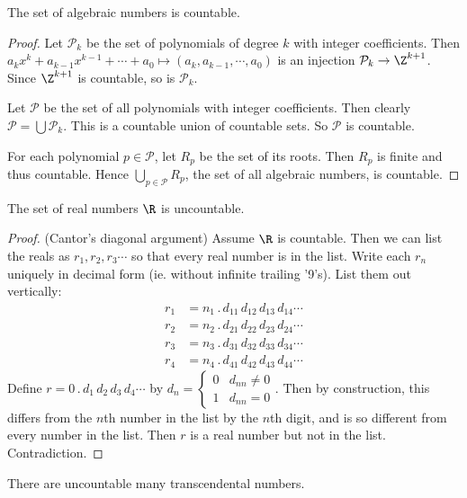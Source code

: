 \documentclass[a4paper]{article}
\begin{document}
\begin{thm}
  The set of algebraic numbers is countable.
\end{thm}
\begin{proof}
  Let $\mathcal{P}_k$ be the set of polynomials of degree $k$ with integer coefficients. Then  $a_kx^k + a_{k - 1}x^{k - 1} + \cdots + a_0 \mapsto (a_k, a_{k - 1}, \cdots, a_0)$ is an injection $\mathcal{P}_k \to \Z^{k + 1}$. Since $\Z^{k + 1}$ is countable, so is $\mathcal{P}_k$.

  Let $\mathcal{P}$ be the set of all polynomials with integer coefficients. Then clearly $\mathcal{P} = \bigcup \mathcal{P}_k$. This is a countable union of countable sets. So $\mathcal{P}$ is countable.

  For each polynomial $p \in \mathcal{P}$, let $R_p$ be the set of its roots. Then $R_p$ is finite and thus countable. Hence $\bigcup_{p\in \mathcal{P}} R_p$, the set of all algebraic numbers, is countable.
\end{proof}

\begin{thm}
  The set of real numbers $\R$ is uncountable.
\end{thm}

\begin{proof}
  (Cantor's diagonal argument) Assume $\R$ is countable. Then we can list the reals as $r_1,r_2,r_3\cdots$ so that every real number is in the list. Write each $r_n$ uniquely in decimal form (ie. without infinite trailing '9's). List them out vertically:
  \begin{align*}
    r_1 &= n_1\,.\,d_{11}\,d_{12}\,d_{13}\,d_{14}\cdots\\
    r_2 &= n_2\,.\,d_{21}\,d_{22}\,d_{23}\,d_{24}\cdots\\
    r_3 &= n_3\,.\,d_{31}\,d_{32}\,d_{33}\,d_{34}\cdots\\
    r_4 &= n_4\,.\,d_{41}\,d_{42}\,d_{43}\,d_{44}\cdots
  \end{align*}
  Define $r = 0\,.\,d_1\,d_2\,d_3\,d_4\cdots$ by $d_n =
  \begin{cases}
    0 & d_{nn}\not= 0\\
    1 & d_{nn}=0
  \end{cases}$. Then by construction, this differs from the $n$th number in the list by the $n$th digit, and is so different from every number in the list. Then $r$ is a real number but not in the list. Contradiction.
\end{proof}

\begin{cor}
  There are uncountable many transcendental numbers.
\end{cor}
\end{document}

